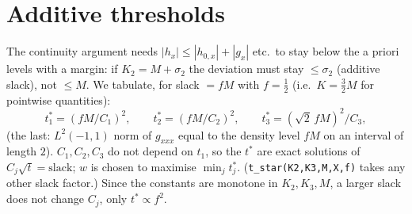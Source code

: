 \documentclass[11pt]{article}
\theoremstyle{remark}\newtheorem{remark}[theorem]{Remark}
\begin{document}
\section{Additive thresholds}
The continuity argument needs $|h_x|\le|h_{0,x}|+|g_x|$ etc.\ to stay below the a priori levels with a margin: if $K_2=M+\sigma_2$ the deviation must stay $\le\sigma_2$ (additive slack), not $\le M$. We tabulate, for slack $=f M$ with $f=\frac12$ (i.e.\ $K=\frac32M$ for pointwise quantities):
\[
t_1^*=(fM/C_1)^2,\qquad t_2^*=(fM/C_2)^2,\qquad t_3^*=(\sqrt2\,fM)^2/C_3 ,
\]
(the last: $L^2(-1,1)$ norm of $g_{xxx}$ equal to the density level $fM$ on an interval of length $2$). $C_1,C_2,C_3$ do not depend on $t_1$, so the $t^*$ are exact solutions of $C_j\sqrt t=\text{slack}$; $w$ is chosen to maximise $\min_jt_j^*$. (\texttt{t\_star(K2,K3,M,X,f)} takes any other slack factor.) Since the constants are monotone in $K_2,K_3,M$, a larger slack does not change $C_j$, only $t^*\propto f^2$.
\end{document}
